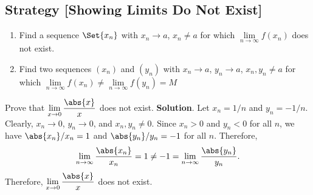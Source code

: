 \subsection*{Strategy [Showing Limits Do Not Exist]}
\begin{enumerate}
    \item Find a sequence $ \Set{x_n} $ with $ x_n\to a $, $ x_n\ne a $ for which $ \lim\limits_{{n} \to {\infty}}f(x_n) $ does not exist.
    \item Find two sequences $ (x_n) $ and $ (y_n) $ with $ x_n\to a $, $ y_n\to a $, $ x_n,y_n\ne a $ for which
          $ \lim\limits_{{n} \to {\infty}}f(x_n)\ne \lim\limits_{{n} \to {\infty}}f(y_n)=M $
\end{enumerate}
\begin{Example}{}{}
    Prove that $ \displaystyle \lim\limits_{{x} \to {0}}\frac{\abs{x}}{x} $ does not exist.
    \tcblower{}
    \textbf{Solution}. Let $ x_n=1/n $ and $ y_n=-1/n $. Clearly, $ x_n\to 0 $, $ y_n\to 0 $, and $ x_n,y_n\ne 0 $.
    Since $ x_n>0 $ and $ y_n<0 $ for all $ n $, we have
    $ \abs{x_n}/x_n=1 $ and $ \abs{y_n}/y_n=-1 $ for all $ n $. Therefore,
    \[ \lim\limits_{{n} \to {\infty}}\frac{\abs{x_n}}{x_n}=1\ne -1=\lim\limits_{{n} \to {\infty}}\frac{\abs{y_n}}{y_n}. \]
    Therefore, $ \displaystyle \lim\limits_{{x} \to {0}}\frac{\abs{x}}{x} $ does not exist.
\end{Example}
